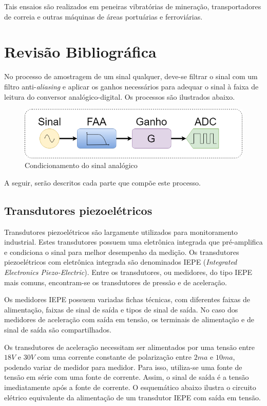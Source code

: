 \documentclass[11pt]{abntex2}
\begin{document}
		Tais ensaios são realizados em peneiras vibratórias de mineração,
        transportadores de correia e outras máquinas de áreas portuárias e ferroviárias.

		\chapter{Revisão Bibliográfica}
			No processo de amostragem de um sinal qualquer, deve-se filtrar o sinal com
			um filtro anti-\textit{aliasing} e aplicar os ganhos necessários para adequar
			o sinal à faixa de leitura do conversor analógico-digital. Os processos são
			ilustrados abaixo.

			\begin{figure}[H]
				\centering
				\includegraphics[width=\linewidth]{../../Fotos/Diagramas/sinalFaaADC/sinalFaaADC.png}
				\caption{Condicionamento do sinal analógico}
			\end{figure}

			A seguir, serão descritos cada parte que compõe este processo.

			\section{Transdutores piezoelétricos}
				Transdutores piezoelétricos são largamente utilizados para
				monitoramento industrial. Estes transdutores possuem uma eletrônica
				integrada que pré-amplifica e condiciona o sinal para melhor
				desempenho da medição. Os transdutores piezoelétricos com eletrônica
				integrada são denominados IEPE (\textit{Integrated Electronics
				Piezo-Electric}). Entre os transdutores, ou medidores, do tipo IEPE
				mais comuns, encontram-se os transdutores de pressão e de
				aceleração.

				Os medidores IEPE possuem variadas fichas técnicas, com diferentes
				faixas de alimentação, faixas de sinal de saída e tipos de sinal de
				saída. No caso dos medidores de aceleração com saída em tensão, os
				terminais de alimentação e de sinal de saída são compartilhados.

				Os transdutores de aceleração necessitam ser alimentados por uma
				tensão entre $18V$ e $30V$ com uma corrente constante de polarização
				entre $2ma$ e $10ma$, podendo variar de medidor para medidor. Para
				isso, utiliza-se uma fonte de tensão em série com uma fonte de
				corrente. Assim, o sinal de saída é a tensão imediatamente após a
				fonte de corrente. O esquemático abaixo ilustra o circuito elétrico
				equivalente da alimentação de um transdutor IEPE com saída em
				tensão.
\end{document}
